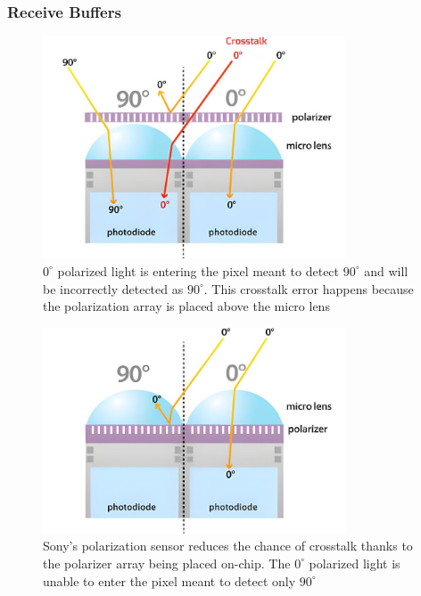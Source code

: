 \subsubsection{Receive Buffers}
\begin{figure}
    \centering
    \includegraphics[width=0.8\textwidth]{figures/crosstalk_upscaled.jpg}
    \caption{$0^{\circ}$ polarized light is entering the pixel meant to detect $90^{\circ}$ and will be incorrectly detected as $90^{\circ}$.  This crosstalk error happens because the polarization array is placed above the micro lens \cite{lucidvisionlabsPolarizationExplainedSony2018}}
    \label{fig:camera_crosstalk}
\end{figure}
\begin{figure}
    \centering
    \includegraphics[width=0.8\textwidth]{figures/crosstalk_off_upscaled.jpg}
    \caption{Sony's polarization sensor reduces the chance of crosstalk thanks to the polarizer array being placed on-chip. The $0^{\circ}$ polarized light is unable to enter the pixel meant to detect only $90^{\circ}$ \cite{lucidvisionlabsPolarizationExplainedSony2018}}
    \label{fig:camera_no_crosstalk}
\end{figure}
